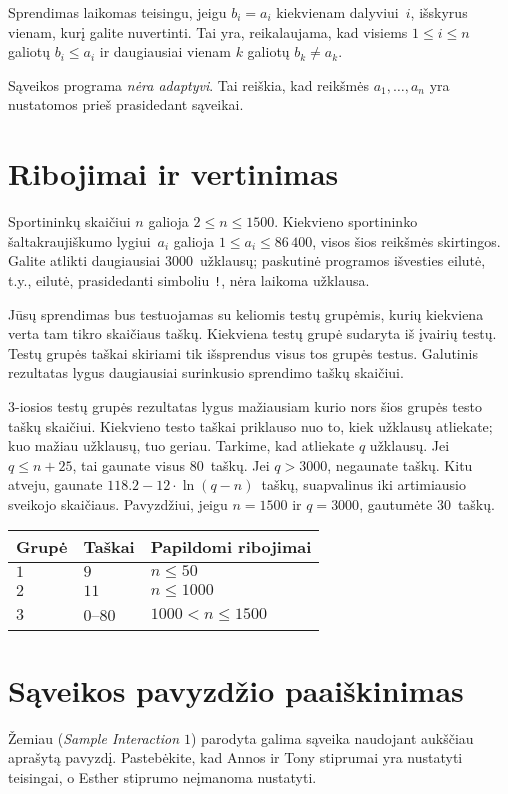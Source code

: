 Sprendimas laikomas teisingu, jeigu $b_i=a_i$ kiekvienam dalyviui~$i$, išskyrus vienam, 
kurį galite nuvertinti.
Tai yra, reikalaujama, kad visiems $1\leq i\leq n$ galiotų $b_i\leq a_i$
ir daugiausiai vienam $k$ galiotų $b_k \neq a_k$.

Sąveikos programa \emph{nėra adaptyvi}. Tai reiškia, kad reikšmės $a_1,\ldots, a_n$ yra nustatomos prieš prasidedant sąveikai.

\section*{Ribojimai ir vertinimas}

Sportininkų skaičiui $n$ galioja
$2\leq n\leq 1500$. %
Kiekvieno sportininko šaltakraujiškumo lygiui~$a_i$ galioja 
$1\leq a_i\leq 86\,400$, %
visos šios reikšmės skirtingos. %
Galite atlikti daugiausiai $3000$~užklausų; %
paskutinė programos išvesties eilutė, t.y., eilutė, prasidedanti simboliu \texttt{!}, nėra laikoma užklausa.

Jūsų sprendimas bus testuojamas su keliomis testų grupėmis, kurių kiekviena verta tam tikro skaičiaus taškų.
Kiekviena testų grupė sudaryta iš įvairių testų.
Testų grupės taškai skiriami tik išsprendus visus tos grupės testus.
Galutinis rezultatas lygus daugiausiai surinkusio sprendimo taškų skaičiui.

$3$-iosios testų grupės rezultatas lygus mažiausiam kurio nors šios grupės testo taškų skaičiui.
Kiekvieno testo taškai priklauso nuo to, kiek užklausų atliekate;
kuo mažiau užklausų, tuo geriau.
Tarkime, kad atliekate $q$ užklausų. 
Jei $q \le n+25$, tai gaunate visus $80$~taškų. 
Jei $q > 3000$, negaunate taškų.
Kitu atveju, gaunate 
$118.2 - 12 \cdot \ln(q - n)$~taškų, suapvalinus iki artimiausio sveikojo skaičiaus. %
Pavyzdžiui, jeigu $n = 1500$ ir $q = 3000$, gautumėte $30$~taškų.

\medskip

\begin{tabular}{lll}
Grupė & Taškai & Papildomi ribojimai\\\hline
$1$  &  $9$ & $n\leq 50$\\
$2$  &  $11$ & $n\leq 1000$\\
$3$  &  $0$--$80$ & $1000 < n\leq 1500$\\
\end{tabular}
\section*{Sąveikos pavyzdžio paaiškinimas}
Žemiau (\emph{Sample Interaction $1$}) parodyta galima sąveika naudojant aukščiau aprašytą pavyzdį.
Pastebėkite, kad Annos ir Tony stiprumai yra nustatyti teisingai, o Esther stiprumo neįmanoma nustatyti.
